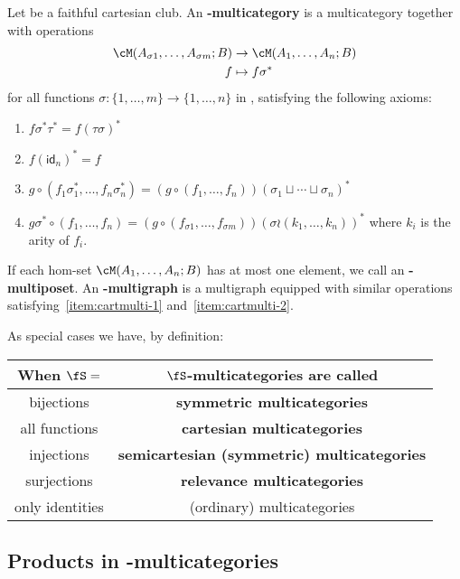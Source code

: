 \documentclass{book}
\def\idfunc{\mathsf{id}}
\begin{document}
\begin{defn}
  Let \fS be a faithful cartesian club.
  An \textbf{\fS-multicategory} is a multicategory \cM together with operations
  \begin{align*}
    \cM(A_{\sigma 1},\dots,A_{\sigma m}; B) &\to \cM(A_1,\dots,A_n;B)\\
    f &\mapsto f\sigma^*
  \end{align*}
  for all functions $\sigma : \{1,\dots,m\} \to \{1,\dots,n\}$ in \fS, satisfying the following axioms:
  \begin{enumerate}
  \item $f \sigma^* \tau^* = f(\tau\sigma)^*$\label{item:cartmulti-1}
  \item $f (\idfunc_n)^* = f$\label{item:cartmulti-2}
  \item $g\circ (f_1 \sigma_1^* ,\dots, f_n \sigma_n^*) = (g \circ (f_1,\dots,f_n))(\sigma_1\sqcup \cdots \sqcup \sigma_n)^*$
  \item $g\sigma^* \circ (f_1,\dots,f_n) = (g\circ (f_{\sigma 1},\dots, f_{\sigma m}))(\sigma \wr (k_1,\dots,k_n))^*$ where $k_i$ is the arity of $f_i$.
  \end{enumerate}
  If each hom-set $\cM(A_1,\dots,A_n;B)$ has at most one element, we call \cM an \textbf{\fS-multiposet}.
  An \textbf{\fS-multigraph} is a multigraph equipped with similar operations satisfying~\ref{item:cartmulti-1} and~\ref{item:cartmulti-2}.
\end{defn}

As special cases we have, by definition:
\begin{center}
\begin{tabular}{c|c}
  When $\fS=$ & $\fS$-multicategories are called\\\hline
  bijections & \textbf{symmetric multicategories}\\
  all functions & \textbf{cartesian multicategories}\\
  injections & \textbf{semicartesian (symmetric) multicategories}\\
  surjections & \textbf{relevance multicategories}\\
  only identities & (ordinary) multicategories
\end{tabular}
\end{center}

\subsection{Products in \fS-multicategories}
\label{sec:cartmulti-prod}
\end{document}
